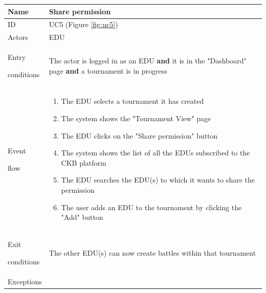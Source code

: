 \begin{center}
    \def\arraystretch{1.5}
    \begin{tabular}{| m{2cm} | m{10cm}|}
        \hline
        Name                  & Share permission                                                                                                            \\ \hline
        ID                    & UC5 (Figure \ref{fig:uc5})                                                                                                  \\ \hline
        Actors                & EDU                                                                                                                         \\ \hline
        Entry \par conditions & The actor is logged in as an EDU \textbf{and} it is in the "Dashboard" page \textbf{and} a tournament is in progress        \\ \hline
        Event \par flow       & \begin{enumerate}
                                    \item The EDU selects a tournament it has created
                                    \item The system shows the "Tournament View" page
                                    \item The EDU clicks on the "Share permission" button
                                    \item The system shows the list of all the EDUs subscribed to the CKB platform
                                    \item The EDU searches the EDU(s) to which it wants to share the permission
                                    \item The user adds an EDU to the tournament by clicking the "Add" button
                                \end{enumerate}                                                                                                             \\ \hline
        Exit \par conditions  & The other EDU(s) can now create battles within that tournament                                                              \\ \hline
        Exceptions            & \begin{itemize}

\end{itemize}
\end{tabular}
\end{center}

